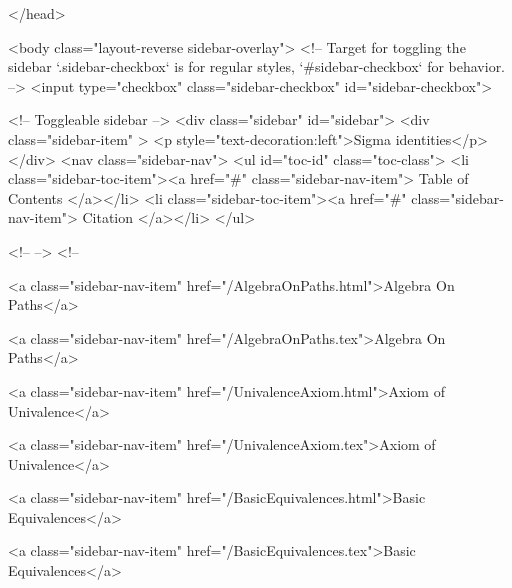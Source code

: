   
</head>




  <body class="layout-reverse sidebar-overlay">
    <!-- Target for toggling the sidebar `.sidebar-checkbox` is for regular
     styles, `#sidebar-checkbox` for behavior. -->
<input type="checkbox" class="sidebar-checkbox" id="sidebar-checkbox">

<!-- Toggleable sidebar -->
<div class="sidebar" id="sidebar">
  <div class="sidebar-item" >
    <p style="text-decoration:left">Sigma identities</p>
  </div>
  <nav class="sidebar-nav">
    <ul id="toc-id" class="toc-class">
  <li class="sidebar-toc-item"><a href="#" class="sidebar-nav-item"> Table of Contents </a></li>
  <li class="sidebar-toc-item"><a href="#" class="sidebar-nav-item"> Citation </a></li>
</ul>


    <!--  -->
    <!-- 
      
    
      
    
      
    
      
    
      
        
      
    
      
        
          <a class="sidebar-nav-item" href="/AlgebraOnPaths.html">Algebra On Paths</a>
        
      
    
      
        
          <a class="sidebar-nav-item" href="/AlgebraOnPaths.tex">Algebra On Paths</a>
        
      
    
      
        
          <a class="sidebar-nav-item" href="/UnivalenceAxiom.html">Axiom of Univalence</a>
        
      
    
      
        
          <a class="sidebar-nav-item" href="/UnivalenceAxiom.tex">Axiom of Univalence</a>
        
      
    
      
        
          <a class="sidebar-nav-item" href="/BasicEquivalences.html">Basic Equivalences</a>
        
      
    
      
        
          <a class="sidebar-nav-item" href="/BasicEquivalences.tex">Basic Equivalences</a>
        
